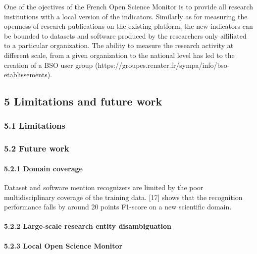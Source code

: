 \documentclass[
]{article}
\begin{document}
One of the ojectives of the French Open Science Monitor is to provide
all research institutions with a local version of the indicators.
Similarly as for measuring the openness of research publications on the
existing platform, the new indicators can be bounded to datasets and
software produced by the researchers only affiliated to a particular
organization. The ability to measure the research activity at different
scale, from a given organization to the national level has led to the
creation of a BSO user group
(https://groupes.renater.fr/sympa/info/bso-etablissements).

\hypertarget{limitations-and-future-work}{%
\subsection{5 Limitations and future
work}\label{limitations-and-future-work}}

\hypertarget{limitations}{%
\subsubsection{5.1 Limitations}\label{limitations}}

\hypertarget{future-work}{%
\subsubsection{5.2 Future work}\label{future-work}}

\hypertarget{domain-coverage}{%
\paragraph{5.2.1 Domain coverage}\label{domain-coverage}}

Dataset and software mention recognizers are limited by the poor
multidisciplinary coverage of the training data. {[}17{]} shows that the
recognition performance falls by around 20 points F1-score on a new
scientific domain.

\hypertarget{large-scale-research-entity-disambiguation}{%
\paragraph{5.2.2 Large-scale research entity
disambiguation}\label{large-scale-research-entity-disambiguation}}

\hypertarget{local-open-science-monitor}{%
\paragraph{5.2.3 Local Open Science
Monitor}\label{local-open-science-monitor}}
\end{document}

